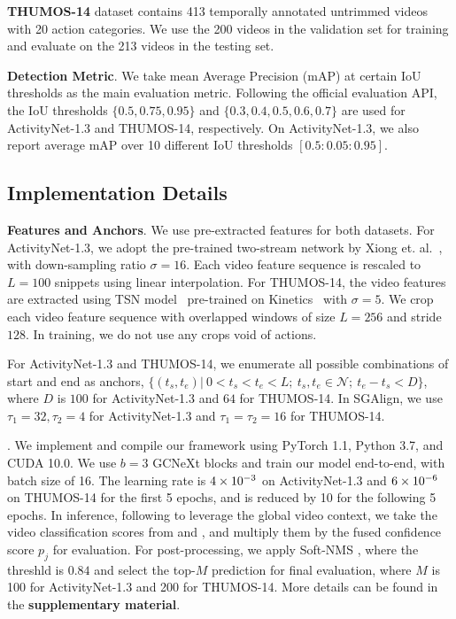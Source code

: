 \documentclass[10pt,twocolumn,letterpaper]{article}
\begin{document}
\noindent
{\bf THUMOS-14} \cite{jiang2014thumos} dataset contains 413 temporally annotated untrimmed videos with 20 action categories. We use the 200 videos in the validation set for training and evaluate on the 213 videos in the testing set. 

\noindent
{\bf Detection Metric}. We take mean Average Precision (mAP) at certain IoU thresholds as the main evaluation metric. 
Following the official evaluation API, the IoU thresholds $\{0.5, 0.75, 0.95\}$ and $\{0.3, 0.4, 0.5, 0.6, 0.7\}$ are used for ActivityNet-1.3 and THUMOS-14, respectively. On ActivityNet-1.3,  we also report average mAP over 10 different IoU thresholds $[0.5: 0.05:0.95]$.


\subsection{Implementation Details} \label{subsec: Details}

\noindent
{\bf Features and Anchors}. We use pre-extracted features for both datasets. For ActivityNet-1.3, we adopt the pre-trained two-stream network by Xiong et. al.~\cite{xiong2016cuhk}, with down-sampling ratio $\sigma = 16$. 
Each video feature sequence is rescaled to $L = 100$ snippets using linear interpolation.
For THUMOS-14, the video features are extracted using TSN model~\cite{TSN2016ECCV} pre-trained on Kinetics~\cite{zisserman2017kinetics}  with $\sigma = 5$.
We crop each video feature sequence with overlapped windows of size $L=256$ and stride $128$. In training, we do not use any crops void of actions.


For ActivityNet-1.3 and THUMOS-14, we enumerate all possible combinations of start and end as anchors, \eg $\{(t_s,t_e)|~ 0< t_s<t_e<L; ~t_s,t_e \in \mathcal{N}; ~t_e-t_s < D\} $, where $D$ is $100$ for ActivityNet-1.3 and $64$ for THUMOS-14. 
In SGAlign, we use $\tau_1=32,\tau_2=4$ for ActivityNet-1.3 and $\tau_1=\tau_2=16$  for THUMOS-14. 



. We implement and compile our framework using PyTorch 1.1, Python 3.7, and CUDA 10.0.
We use $b=3$ 
GCNeXt blocks and train our model end-to-end, with batch size of 16. 
The learning rate is $4\times 10^{-3}$ on ActivityNet-1.3 and 
$6\times 10^{-6} $ on THUMOS-14 for the first 5 epochs, and is reduced by 10 for the following 5 epochs.
In inference, following \cite{lin2018bsn}  to leverage the global video context, we take the video classification scores from \cite{wang2017untrimmed} and \cite{xiong2016cuhk}, and multiply them by the fused confidence score $p_j$ for evaluation.
For post-processing, we apply Soft-NMS \cite{softNMS}, where the threshld is $0.84$ and select the top-$M$ prediction for final evaluation, where $M$ is 100 for  ActivityNet-1.3 and 200 for THUMOS-14.
More details can be found in the \textbf{supplementary material}.
 
\end{document}
